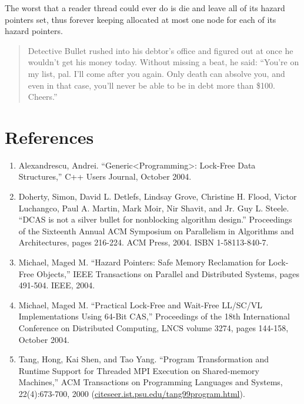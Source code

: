 \documentclass[a4paper,12pt,notitlepage,twoside,openright]{article}
\begin{document}
The worst that a reader thread could ever do is die and leave all of its hazard pointers set, thus forever keeping allocated at most one node for each of its hazard pointers.

\begin{quote}
Detective Bullet rushed into his debtor's office and figured out at once he wouldn't get his money today. Without missing a beat, he said: ``You're on my list, pal. I'll come after you again. Only death can absolve you, and even in that case, you'll never be able to be in debt more than \$100. Cheers.''
\end{quote}

\section{References}

\begin{enumerate}
  \item Alexandrescu, Andrei. ``Generic<Programming>: Lock-Free Data Structures,'' C++ Users Journal, October 2004.
\item Doherty, Simon, David L. Detlefs, Lindsay Grove, Christine H. Flood, Victor Luchangco, Paul A. Martin, Mark Moir, Nir Shavit, and Jr. Guy L. Steele. ``DCAS is not a silver bullet for nonblocking algorithm design.'' Proceedings of the Sixteenth Annual ACM Symposium on Parallelism in Algorithms and Architectures, pages 216-224. ACM Press, 2004. ISBN 1-58113-840-7.
\item Michael, Maged M. ``Hazard Pointers: Safe Memory Reclamation for Lock-Free Objects,'' IEEE Transactions on Parallel and Distributed Systems, pages 491-504. IEEE, 2004.
\item Michael, Maged M. ``Practical Lock-Free and Wait-Free LL/SC/VL Implementations Using 64-Bit CAS,'' Proceedings of the 18th International Conference on Distributed Computing, LNCS volume 3274, pages 144-158, October 2004.
\item Tang, Hong, Kai Shen, and Tao Yang. ``Program Transformation and Runtime Support for Threaded MPI Execution on Shared-memory Machines,'' ACM Transactions on Programming Languages and Systems, 22(4):673-700, 2000 (\url{citeseer.ist.psu.edu/tang99program.html}).
\end{enumerate}
\end{document}
